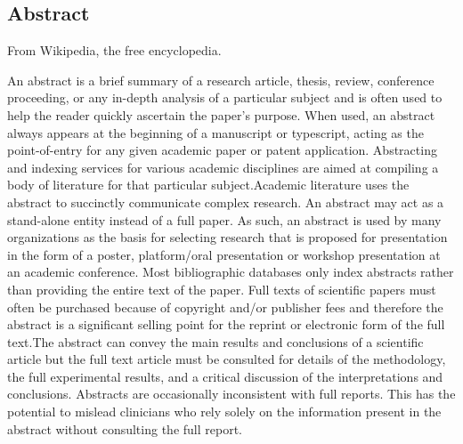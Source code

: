 
\newpage
{}
\thispagestyle{empty}
%
\begin{spacing}{1.5}
%
\chapter*{Abstract}

From Wikipedia, the free encyclopedia.

An abstract is a brief summary of a research article, thesis, review, conference proceeding, or any in-depth analysis of a particular subject and is often used to help the reader quickly ascertain the paper's purpose. When used, an abstract always appears at the beginning of a manuscript or typescript, acting as the point-of-entry for any given academic paper or patent application. Abstracting and indexing services for various academic disciplines are aimed at compiling a body of literature for that particular subject.Academic literature uses the abstract to succinctly communicate complex research. An abstract may act as a stand-alone entity instead of a full paper. As such, an abstract is used by many organizations as the basis for selecting research that is proposed for presentation in the form of a poster, platform/oral presentation or workshop presentation at an academic conference. Most bibliographic databases only index abstracts rather than providing the entire text of the paper. Full texts of scientific papers must often be purchased because of copyright and/or publisher fees and therefore the abstract is a significant selling point for the reprint or electronic form of the full text.The abstract can convey the main results and conclusions of a scientific article but the full text article must be consulted for details of the methodology, the full experimental results, and a critical discussion of the interpretations and conclusions. Abstracts are occasionally inconsistent with full reports. This has the potential to mislead clinicians who rely solely on the information present in the abstract without consulting the full report.






\end{spacing}